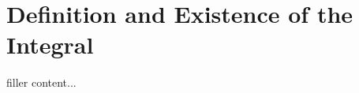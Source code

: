 \section{Definition and Existence of the Integral}\label{sec:definition-and-existence-of-the-integral}

filler content...

